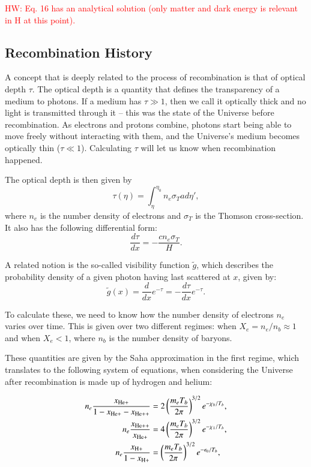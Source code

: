 \documentclass{aa}
\newcommand{\hw}[1]{\textcolor{red}{HW: #1}}
\begin{document}
\hw{Eq. 16 has an analytical solution (only matter and dark energy is relevant in H at this point).}

\subsection{Recombination History}

A concept that is deeply related to the process of recombination is that of optical depth $\tau$. The optical depth is a quantity that defines the transparency of a medium to photons. If a medium has $\tau\gg1$, then we call it optically thick and no light is transmitted through it -- this was the state of the Universe before recombination. As electrons and protons combine, photons start being able to move freely without interacting with them, and the Universe's medium becomes optically thin ($\tau\ll 1$). Calculating $\tau$ will let us know when recombination happened.

The optical depth is then given by
\begin{equation}
\tau(\eta) = \int_{\eta}^{\eta_0} n_e \sigma_T a d\eta',
\end{equation}
where $n_e$ is the number density of electrons and $\sigma_T$ is the Thomson cross-section. It also has the following differential form:
\begin{equation}
\frac{d\tau}{dx} = -\frac{c n_e \sigma_T}{H}.
\end{equation}

A related notion is the so-called visibility function $\tilde g$, which describes the probability density of a given photon having last scattered at $x$, given by:
\begin{equation}
\tilde{g}(x) = \frac{d}{dx}e^{-\tau} = -\frac{d\tau}{dx}e^{-\tau}.
\end{equation}

To calculate these, we need to know how the number density of electrons $n_e$ varies over time. This is given over two different regimes: when $X_e = n_e/n_b \approx 1$ and when $X_e < 1$, where $n_b$ is the number density of baryons.

These quantities are given by the Saha approximation in the first regime, which translates to the following system of equations, when considering the Universe after recombination is made up of hydrogen and helium:

\begin{align}
n_e\frac{x_{\rm He+}}{1-x_{\rm He+}-x_{\rm He++}} &= 2\left(\frac{m_eT_b}{2\pi}\right)^{3/2}e^{-\chi_0/T_b},\\
n_e\frac{x_{\rm He++}}{x_{\rm He+}} &= 4\left(\frac{m_eT_b}{2\pi}\right)^{3/2}e^{-\chi_1/T_b},\\
n_e\frac{x_{\rm H+}}{1-x_{\rm H+}} &= \left(\frac{m_eT_b}{2\pi}\right)^{3/2}e^{-\epsilon_0/T_b}, \label{eq:saha_h}
\end{align}
\end{document}
